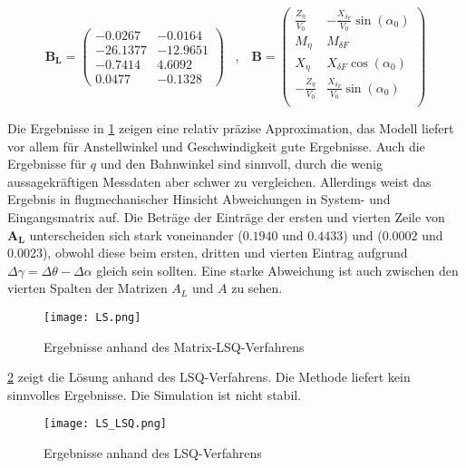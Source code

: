 \begin{equation}
 	 \mathbf{B_L} = \begin{pmatrix}
 		-0.0267 & -0.0164 \\ 
 		-26.1377 & -12.9651 \\
 		-0.7414 & 4.6092 \\
 		0.0477 & -0.1328
 	\end{pmatrix}  \;\;\; , \;\;\;
 	\mathbf{B}= \begin{pmatrix}
		\frac{Z_\eta}{V_0} & -\frac{X_{\delta_F}}{V_0} \sin{(\alpha_0)}\\
		M_\eta & M_{\delta F}\\
		X_\eta & X_{\delta F} \cos{(\alpha_0)}\\
		-\frac{Z_\eta}{V_0} & \frac{X_{\delta_F}}{V_0} \sin{(\alpha_0)}\\
	\end{pmatrix}
 \nonumber
\end{equation}

Die Ergebnisse in \cref{fig:Ergebnisse_zmlsq} zeigen eine relativ präzise Approximation, das Modell liefert vor allem für 
Anstellwinkel und Geschwindigkeit gute Ergebnisse. Auch die Ergebnisse für $ q $ und den Bahnwinkel sind sinnvoll, durch die 
wenig aussagekräftigen Messdaten aber schwer zu vergleichen. Allerdings weist das Ergebnis in flugmechanischer Hinsicht 
Abweichungen in System- und Eingangsmatrix auf. Die Beträge der Einträge der ersten und vierten Zeile von $\mathbf{A_L}$ 
unterscheiden sich stark voneinander ($0.1940$ und $0.4433$) und ($0.0002$ und $0.0023$), obwohl diese beim ersten, dritten 
und vierten Eintrag aufgrund $\Delta \gamma = \Delta \theta - \Delta \alpha$ gleich sein sollten. Eine starke Abweichung ist 
auch zwischen den vierten Spalten der Matrizen $A_L$ und $A$ zu sehen.

\begin{figure}[h!]
	\centering
	\texttt{[image: LS.png]}
	\caption{Ergebnisse anhand des Matrix-LSQ-Verfahrens}
    \label{fig:Ergebnisse_zmlsq}
\end{figure}

\cref{fig:Ergebnisse_zlsq} zeigt die Lösung anhand des LSQ-Verfahrens. Die Methode liefert kein sinnvolles Ergebnisse. Die 
Simulation ist nicht stabil.

 \begin{figure}[h!]
	\centering
	\texttt{[image: LS\_LSQ.png]}
	\caption{Ergebnisse anhand des LSQ-Verfahrens}
     \label{fig:Ergebnisse_zlsq} 
\end{figure}


